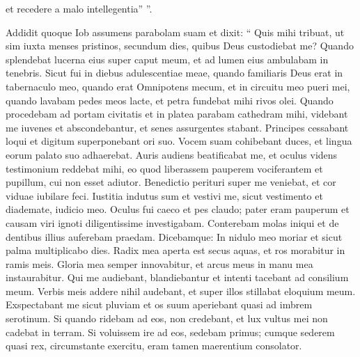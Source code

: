 \begin{biblechapter}
\begin{biblechapter}
\begin{biblechapter}
\begin{biblechapter}
\begin{biblechapter}
\begin{biblechapter}
\begin{biblechapter}
\begin{biblechapter}
\begin{biblechapter}
\begin{biblechapter}
\begin{biblechapter}
\begin{biblechapter}
\begin{biblechapter}
\begin{biblechapter}
\begin{biblechapter}
\begin{biblechapter}
\begin{biblechapter}
\begin{biblechapter}
\begin{biblechapter}
\begin{biblechapter}
\begin{biblechapter}
\begin{biblechapter}
\begin{biblechapter}
\begin{biblechapter}
\begin{biblechapter}
\begin{biblechapter}
\begin{biblechapter}
\begin{biblechapter}
 et recedere a malo intellegentia” ”.
 
\begin{biblechapter}
\verse Addidit quoque Iob assumens parabolam suam et dixit:
 \verse “ Quis mihi tribuat, ut sim iuxta menses pristinos,
 secundum dies, quibus Deus custodiebat me?
 \verse Quando splendebat lucerna eius super caput meum,
 et ad lumen eius ambulabam in tenebris.
 \verse Sicut fui in diebus adulescentiae meae,
 quando familiaris Deus erat in tabernaculo meo,
 \verse quando erat Omnipotens mecum,
 et in circuitu meo pueri mei,
 \verse quando lavabam pedes meos lacte,
 et petra fundebat mihi rivos olei.
 \verse Quando procedebam ad portam civitatis
 et in platea parabam cathedram mihi,
 \verse videbant me iuvenes et abscondebantur,
 et senes assurgentes stabant.
 \verse Principes cessabant loqui
 et digitum superponebant ori suo.
 \verse Vocem suam cohibebant duces,
 et lingua eorum palato suo adhaerebat.
 \verse Auris audiens beatificabat me,
 et oculus videns testimonium reddebat mihi,
 \verse eo quod liberassem pauperem vociferantem
 et pupillum, cui non esset adiutor.
 \verse Benedictio perituri super me veniebat,
 et cor viduae iubilare feci.
 \verse Iustitia indutus sum et vestivi me,
 sicut vestimento et diademate, iudicio meo.
 \verse Oculus fui caeco
 et pes claudo;
 \verse pater eram pauperum
 et causam viri ignoti diligentissime investigabam.
 \verse Conterebam molas iniqui
 et de dentibus illius auferebam praedam.
 \verse Dicebamque: In nidulo meo moriar
 et sicut palma multiplicabo dies.
 \verse Radix mea aperta est secus aquas,
 et ros morabitur in ramis meis.
 \verse Gloria mea semper innovabitur,
 et arcus meus in manu mea instaurabitur.
 \verse Qui me audiebant, blandiebantur
 et intenti tacebant ad consilium meum.
 \verse Verbis meis addere nihil audebant,
 et super illos stillabat eloquium meum.
 \verse Exspectabant me sicut pluviam
 et os suum aperiebant quasi ad imbrem serotinum.
 \verse Si quando ridebam ad eos, non credebant,
 et lux vultus mei non cadebat in terram.
 \verse Si voluissem ire ad eos, sedebam primus;
 cumque sederem quasi rex, circumstante exercitu,
 eram tamen maerentium consolator.
 

\end{biblechapter}
\end{biblechapter}
\end{biblechapter}
\end{biblechapter}
\end{biblechapter}
\end{biblechapter}
\end{biblechapter}
\end{biblechapter}
\end{biblechapter}
\end{biblechapter}
\end{biblechapter}
\end{biblechapter}
\end{biblechapter}
\end{biblechapter}
\end{biblechapter}
\end{biblechapter}
\end{biblechapter}
\end{biblechapter}
\end{biblechapter}
\end{biblechapter}
\end{biblechapter}
\end{biblechapter}
\end{biblechapter}
\end{biblechapter}
\end{biblechapter}
\end{biblechapter}
\end{biblechapter}
\end{biblechapter}
\end{biblechapter}
